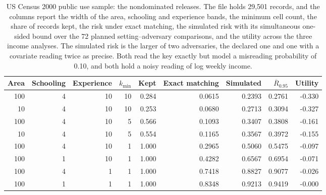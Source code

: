 \begin{table}[t]
\centering
\caption{US Census 2000 public use sample: the nondominated releases. The file holds 29{,}501 records, and the columns report the width of the area, schooling and experience bands, the minimum cell count, the share of records kept, the risk under exact matching, the simulated risk with its simultaneous one-sided bound over the 72 planned setting--adversary comparisons, and the utility across the three income analyses. The simulated risk is the larger of two adversaries, the declared one and one with a covariate reading twice as precise. Both read the key exactly but model a misreading probability of 0.10, and both hold a noisy reading of log weekly income.}
\label{tab:real}
\small
\begin{tabular}{rrrrrrrrr}
\toprule
Area & Schooling & Experience & $k_{\min}$ & Kept & Exact matching & Simulated & $\overline{R}_{0.95}$ & Utility \\
\midrule
100 & 4 & 10 & 10 & 0.284 & 0.0615 & 0.2393 & 0.2761 & -0.330 \\
10 & 4 & 10 & 10 & 0.253 & 0.0680 & 0.2713 & 0.3094 & -0.327 \\
100 & 4 & 10 & 5 & 0.566 & 0.1093 & 0.3407 & 0.3808 & -0.161 \\
10 & 4 & 10 & 5 & 0.554 & 0.1165 & 0.3567 & 0.3972 & -0.155 \\
100 & 4 & 10 & 1 & 1.000 & 0.2965 & 0.5060 & 0.5475 & -0.097 \\
100 & 1 & 10 & 1 & 1.000 & 0.4282 & 0.6567 & 0.6954 & -0.071 \\
100 & 4 & 1 & 1 & 1.000 & 0.7418 & 0.8827 & 0.9077 & -0.026 \\
100 & 1 & 1 & 1 & 1.000 & 0.8348 & 0.9213 & 0.9419 & -0.000 \\
\bottomrule
\end{tabular}
\end{table}

